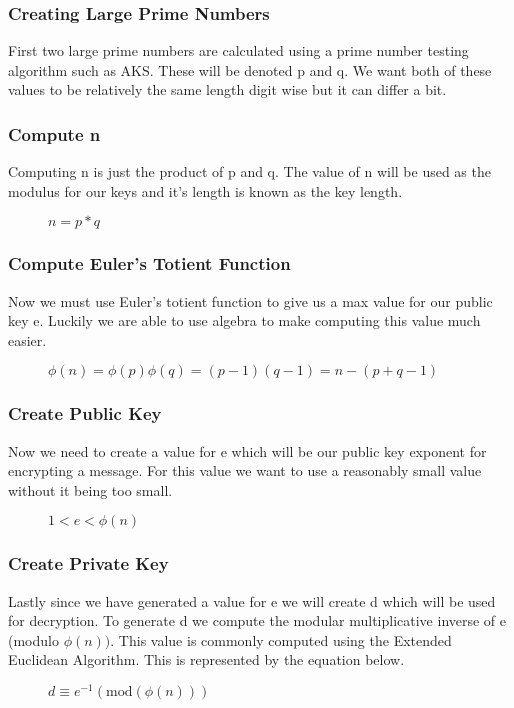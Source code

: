 \documentclass[conference]{IEEEtran}
\begin{document}
\subsubsection{Creating Large Prime Numbers}
First two large prime numbers are calculated using a prime number testing algorithm such as AKS. These will be denoted p and q. We want both of these values to be relatively the same length digit wise but it can differ a bit. 

\subsubsection{Compute n}
Computing n is just the product of p and q. The value of n will be used as the modulus for our keys and it's length is known as the key length.

\begin{figure}[h]
	\begin{center}
		$n=p * q$
	\end{center}
\end{figure}

\subsubsection{Compute Euler's Totient Function}
Now we must use Euler's totient function to give us a max value for our public key e.
Luckily we are able to use algebra to make computing this value much easier.
\begin{figure}[h]
	\begin{center}
		$\phi \left(n\right)=\phi \left(p\right)\phi \left(q\right)=\left(p-1\right)\left(q-1\right)=n-\left(p+q-1\right)$
	\end{center}
\end{figure}

\subsubsection{Create Public Key}
Now we need to create a value for e which will be our public key exponent for encrypting a message. For this value we want to use a reasonably small value without it being too small. 
\begin{figure}[h]
	\begin{center}
		$1 < e < \phi \left(n\right)$
	\end{center}
\end{figure}
\subsubsection{Create Private Key}
Lastly since we have generated a value for e we will create d which will be used for decryption. To generate d we compute the modular multiplicative inverse of e (modulo $ \phi \left(n\right))$. This value is commonly computed using the Extended Euclidean Algorithm. This is represented by the equation below.
\begin{figure}[h]
	\begin{center}
		$d\equiv {e}^{-1}\left(\mathrm{mod}\left(\phi \left(n\right)\right)\right)$
	\end{center}
\end{figure}
\end{document}
